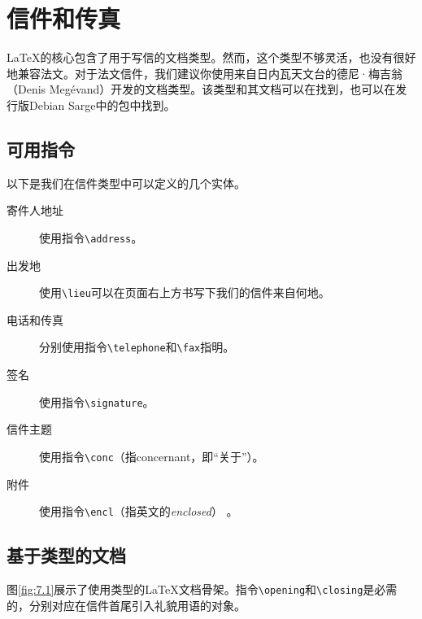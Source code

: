 \section{信件和传真}

\LaTeX 的核心包含了用于写信的文档类型。然而，这个类型不够灵活，也没有很好地兼容\linebreak 法文。对于法文信件，我们建议你使用来自日内瓦天文台的德尼·梅吉翁（Denis Megévand）开发的文档类型。该类型和其文档可以在找到，也可以在发行版Debian Sarge中的包中找到。

\subsection{可用指令}

以下是我们在信件类型中可以定义的几个实体。

\begin{description}
    \item[寄件人地址] 使用指令\verb|\address|。
    \item[出发地] 使用\verb|\lieu|可以在页面右上方书写下我们的信件来自何地。
    \item[电话和传真] 分别使用指令\verb|\telephone|和\verb|\fax|指明。
    \item[签名] 使用指令\verb|\signature|。
    \item[信件主题] 使用指令\verb|\conc|（指concernant，即``关于''）。
    \item[附件] 使用指令\verb|\encl|（指英文的\emph{enclosed}） 。
\end{description}

\subsection{基于类型的文档}

图\ref{fig:7.1}展示了使用类型的\LaTeX 文档骨架。指令\verb|\opening|和\verb|\closing|是必需的，分别对应在信件首尾引入礼貌用语的对象。

